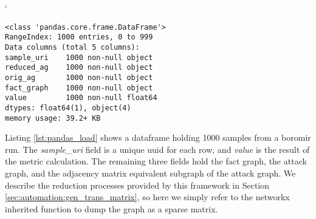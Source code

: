 
`

\begin{verbatim}
<class 'pandas.core.frame.DataFrame'>
RangeIndex: 1000 entries, 0 to 999
Data columns (total 5 columns):
sample_uri    1000 non-null object
reduced_ag    1000 non-null object
orig_ag       1000 non-null object
fact_graph    1000 non-null object
value         1000 non-null float64
dtypes: float64(1), object(4)
memory usage: 39.2+ KB
\end{verbatim}
\label{lst:pandas_load}

Listing \ref{lst:pandas_load} shows a dataframe holding 1000 samples from a boromir run. The \textit{sample\_uri} field is a unique uuid for each row, and \textit{value} is the result of the metric calculation. The remaining three fields hold the fact graph, the attack graph, and the adjacency matrix equivalent subgraph  of the attack graph. We describe the reduction processes provided by this framework in Section \ref{sec:automation:gen_trans_matrix}, so here we simply refer to the networkx inherited function to dump the graph as a sparse matrix. 



